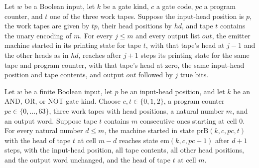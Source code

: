 \begin{theorem}
\label{BoolCircuit.CktSatReduction.Emitter.print_walk}
\leanok
{}
Let $w$ be a Boolean input, let $k$ be a gate kind, $c$ a gate code, $pc$ a program
counter, and $t$ one of the three work tapes. Suppose the input-head position is $p$,
the work tapes are given by $tp$, their head positions by $hd$, and tape $t$ contains
the unary encoding of $m$. For every $j\le m$ and every output list $out$, the emitter
machine started in its printing state for tape $t$, with that tape's head at $j-1$ and
the other heads as in $hd$, reaches after $j+1$ steps its printing state for the same
tape and program counter, with that tape's head at zero, the same input-head position
and tape contents, and output $out$ followed by $j$ true bits.
\end{theorem}

\begin{theorem}
\label{BoolCircuit.CktSatReduction.Emitter.back_walk}
\leanok
{}
Let $w$ be a finite Boolean input, let $p$ be an input-head position, and let $k$ be an
AND, OR, or NOT gate kind. Choose $c,t\in\{0,1,2\}$, a program counter
$pc\in\{0,\ldots,63\}$, three work tapes with head positions, a natural number $m$, and
an output word. Suppose tape $t$ contains $m$ consecutive ones starting at cell $0$. For
every natural number $d\le m$, the machine started in state $\mathrm{prB}(k,c,pc,t)$
with the head of tape $t$ at cell $m-d$ reaches state $\mathrm{em}(k,c,pc+1)$ after
$d+1$ steps, with the input-head position, all tape contents, all other head positions,
and the output word unchanged, and the head of tape $t$ at cell $m$.
\end{theorem}


